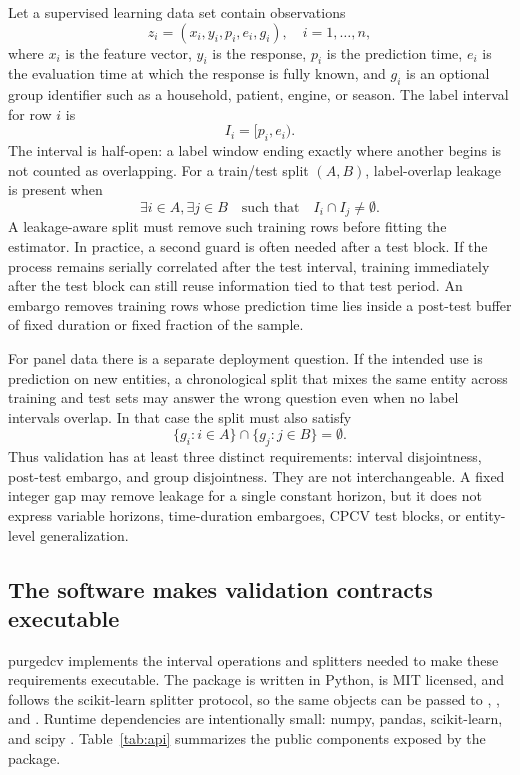 \documentclass[10pt]{article}
\newcommand{\pcv}{\textsf{purgedcv}}
\newcommand{\pkg}[1]{\textsf{#1}}
\DeclareRobustCommand{\code}[1]{\texttt{\detokenize{#1}}}
\begin{document}
Let a supervised learning data set contain observations
\[
  z_i = (x_i, y_i, p_i, e_i, g_i), \quad i = 1,\ldots,n,
\]
where $x_i$ is the feature vector, $y_i$ is the response, $p_i$ is the
prediction time, $e_i$ is the evaluation time at which the response is fully
known, and $g_i$ is an optional group identifier such as a household, patient,
engine, or season. The label interval for row $i$ is
\[
  I_i = [p_i, e_i).
\]
The interval is half-open: a label window ending exactly where another begins
is not counted as overlapping. For a train/test split $(A, B)$,
label-overlap leakage is present when
\[
  \exists i \in A, \exists j \in B
  \quad \text{such that} \quad I_i \cap I_j \ne \emptyset .
\]
A leakage-aware split must remove such training rows before fitting the
estimator. In practice, a second guard is often needed after a test block. If the
process remains serially correlated after the test interval, training
immediately after the test block can still reuse information tied to that test
period. An embargo removes training rows whose prediction time lies inside a
post-test buffer of fixed duration or fixed fraction of the sample.

For panel data there is a separate deployment question. If the intended use is
prediction on new entities, a chronological split that mixes the same entity
across training and test sets may answer the wrong question even when no label
intervals overlap. In that case the split must also satisfy
\[
  \{g_i: i \in A\} \cap \{g_j: j \in B\} = \emptyset .
\]
Thus validation has at least three distinct requirements: interval disjointness,
post-test embargo, and group disjointness. They are not interchangeable. A fixed
integer gap may remove leakage for a single constant horizon, but it does not
express variable horizons, time-duration embargoes, CPCV test blocks, or
entity-level generalization.

\subsection{The software makes validation contracts executable}

\pcv{} implements the interval operations and splitters needed to make these
requirements executable. The package is written in Python, is MIT licensed, and
follows the \pkg{scikit-learn} splitter protocol, so the same objects can be
passed to \code{cross_val_score}, \code{GridSearchCV}, and \code{Pipeline}.
Runtime dependencies are intentionally small: \pkg{numpy}, \pkg{pandas},
\pkg{scikit-learn}, and \pkg{scipy}
\citep{harris2020numpy,mckinney2010pandas,pedregosa2011sklearn,virtanen2020scipy}.
Table~\ref{tab:api} summarizes the public components exposed by the package.
\end{document}
